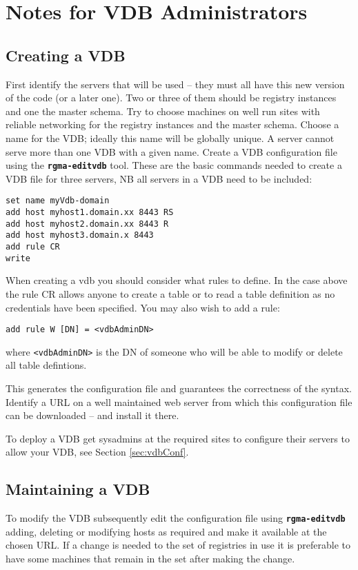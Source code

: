 \section{Notes for VDB Administrators}

\subsection{Creating a VDB}
First identify the servers that will be used {--} they must all have
this new version of the code (or a later one). Two or three of them
should be registry instances and one the master schema. Try to choose
machines on well run sites with reliable networking for the registry
instances and the master schema. Choose a name for the VDB; ideally
this name will be globally unique. A server cannot serve more than one
VDB with a given name. Create a VDB configuration file using the
\texttt{\textbf{rgma{}-editvdb}} tool. These are the basic commands
needed to create a VDB file for three servers, NB all servers in a
VDB need to be included:

\begin{verbatim}
set name myVdb-domain
add host myhost1.domain.xx 8443 RS
add host myhost2.domain.xx 8443 R
add host myhost3.domain.x 8443
add rule CR
write
\end{verbatim}

When creating a vdb you should consider what rules to define.  In the case
above the rule CR allows anyone to create a table or
to read a table definition as no credentials have been specified. You may also
wish to add a rule:

\begin{verbatim}
add rule W [DN] = <vdbAdminDN>
\end{verbatim}

where \verb/<vdbAdminDN>/ is the DN of someone who will be able to modify or
delete all table defintions.

This generates the configuration file and guarantees the correctness
of the syntax. Identify a URL on a well maintained web server from
which this configuration file can be downloaded {--} and install it there.

To deploy a VDB get sysadmins at the required sites to configure their
servers to allow your VDB, see Section \ref{sec:vdbConf}.

\subsection{Maintaining a VDB}
To modify the VDB subsequently edit the configuration file using
\texttt{\textbf{rgma{}-editvdb}} adding, deleting or modifying hosts as
required and make it available at the chosen URL. If a change is
needed to the set of registries in use it is preferable to have some
machines that remain in the set after making the change.

